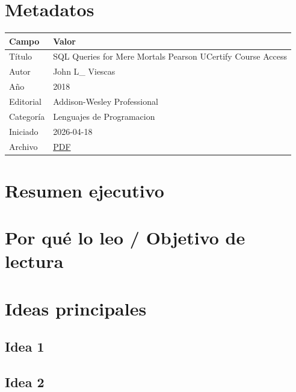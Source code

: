 \section{Metadatos}\label{metadatos}

{\def\LTcaptype{none} %
\begin{longtable}[]{@{}ll@{}}
\toprule\noalign{}
Campo & Valor \\
\midrule\noalign{}
\endhead
\bottomrule\noalign{}
\endlastfoot
Título & SQL Queries for Mere Mortals Pearson UCertify Course Access \\
Autor & John L\_ Viescas \\
Año & 2018 \\
Editorial & Addison-Wesley Professional \\
Categoría & Lenguajes de Programacion \\
Iniciado & 2026-04-18 \\
Archivo & \href{file:///home/emanuel/Biblioteca/cursos_mit/Electrical\%20Engineering\%20and\%20Computer\%20Science\%20(Course\%206)/02_Programming_Languages/SQL\%20Queries\%20for\%20Mere\%20Mortals\%20Pearson\%20UCertify\%20Course\%20Access\%20--\%20John\%20L_\%20Viescas\%20--\%20For\%20Mere\%20Mortals,\%204,\%202018\%20--\%20Addison-Wesley\%20Professional\%20--\%209780134858333\%20--\%20d4bbc8ce47bf01b1db74daf5e4bc9a89\%20--\%20Anna’s\%20Archive.pdf}{PDF} \\
\end{longtable}
}

\section{Resumen ejecutivo}\label{resumen-ejecutivo}

\section{Por qué lo leo / Objetivo de lectura}\label{por-quuxe9-lo-leo-objetivo-de-lectura}

\section{Ideas principales}\label{ideas-principales}

\subsection{Idea 1}\label{idea-1}

\subsection{Idea 2}\label{idea-2}

